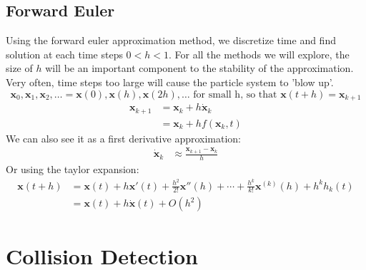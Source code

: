 \documentclass{article}
\begin{document}
\subsection{Forward Euler}
Using the forward euler approximation method, we discretize time and find solution at each time steps $0<h<1$. For all the methods we will explore, the size of $h$ will be an important component to the stability of the approximation. Very often, time steps too large will cause the particle system to 'blow up'.
\[\mathbf{x}_0, \mathbf{x}_1, \mathbf{x}_2, \ldots = \mathbf{x}(0),\mathbf{x}(h), \mathbf{x}(2h), \ldots \mbox{ for small h, so that } \mathbf{x}(t+h) = \mathbf{x}_{k+1}\]
\begin{align}
    \mathbf{x}_{k+1} &= \mathbf{x}_k + h \mathbf{\dot{x}}_k \\
                     &= \mathbf{x}_k + h f(\mathbf{x}_k, t) 
\end{align}
We can also see it as a first derivative approximation:
\begin{align}
    \mathbf{\dot{x}}_k &\approx \frac{\mathbf{x}_{k+1}-\mathbf{x}_k}{h}
\end{align}
Or using the taylor expansion:
\begin{align}
    \mathbf{x}(t+h) &= \mathbf{x}(t) + h \mathbf{x}'(t) + \frac{h^2}{2!}\mathbf{x}''(h)+ \cdots + \frac{h^k}{k!}\mathbf{x}^{(k)}(h) +  h^k h_k(t) \\
    &= \mathbf{x}(t) + h \mathbf{\dot{x}}(t) + O(h^2)
\end{align}
\section{Collision Detection}
\end{document}
